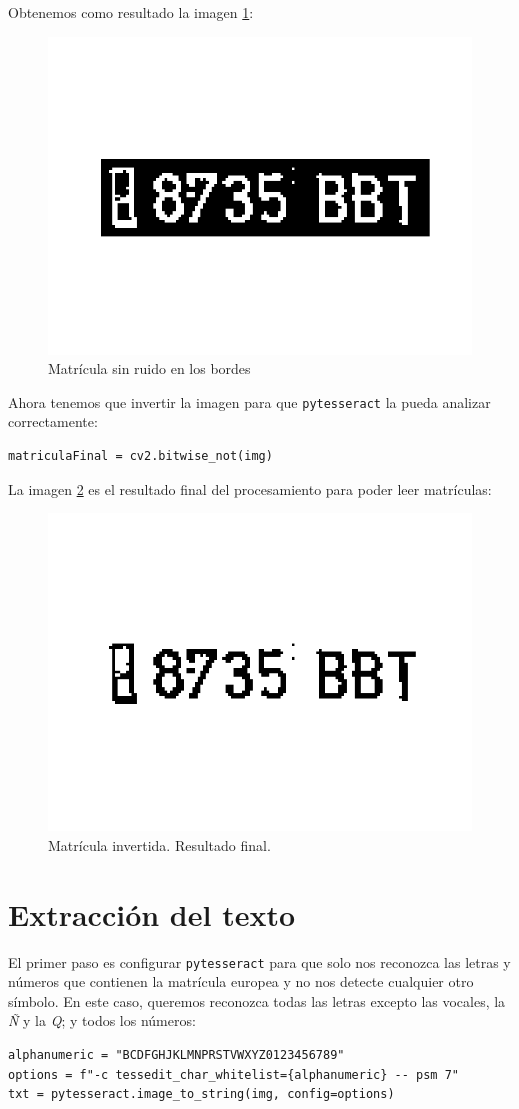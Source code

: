Obtenemos como resultado la imagen \ref{coche1MatriculaSinBordes}:
\begin{figure}[H]
    \centering
    \includegraphics[width=.4\linewidth]{Images/coche1MatriculaSinBordes.png}
    \caption{Matrícula sin ruido en los bordes}
    \label{coche1MatriculaSinBordes}
\end{figure}

Ahora tenemos que invertir la imagen para que \texttt{pytesseract} la pueda analizar correctamente:
\begin{verbatim}
matriculaFinal = cv2.bitwise_not(img)
\end{verbatim}

La imagen \ref{coche1MatriculaFinal} es el resultado final del procesamiento para poder leer matrículas:
\begin{figure}[H]
    \centering
    \includegraphics[width=.4\linewidth]{Images/coche1MatriculaFinal.png}
    \caption{Matrícula invertida. Resultado final.}
    \label{coche1MatriculaFinal}
\end{figure}

\section{Extracción del texto}
El primer paso es configurar \texttt{pytesseract} para que solo nos reconozca las letras y números que contienen la matrícula europea y no nos detecte cualquier otro símbolo. En este caso, queremos reconozca todas las letras excepto las vocales, la \textit{Ñ} y la \textit{Q}; y todos los números:
\begin{verbatim}
alphanumeric = "BCDFGHJKLMNPRSTVWXYZ0123456789"
options = f"-c tessedit_char_whitelist={alphanumeric} -- psm 7"
txt = pytesseract.image_to_string(img, config=options)
\end{verbatim}

